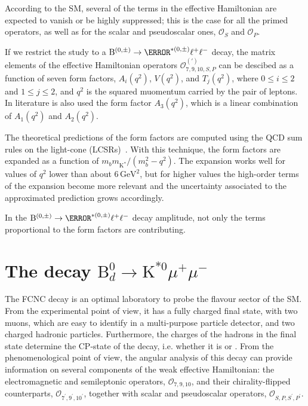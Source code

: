 According to the SM, several of the terms in the effective Hamiltonian are expected to vanish or be highly suppressed; this is the case for all the primed operators, as well as for the scalar and pseudoscalar ones, ${\mathcal{O}}_{S}$ and ${\mathcal{O}}_{P}$.

If we restrict the study to a $\mathrm{B}^{(0,\pm)}\to\K^{*(0,\pm)}\ell^+\ell^-$ decay, the matrix elements of the effective Hamiltonian operators ${\mathcal{O}}^{(\prime)}_{7,9,10,S,P}$ can be descibed as a function of seven form factors, $A_i(q^2)$, $V(q^2)$, and $T_j(q^2)$, where $0\le i\le2$ and $1\le j\le2$, and $q^2$ is the squared muomentum carried by the pair of leptons.
In literature is also used the form factor $A_3(q^2)$, which is a linear combination of $A_1(q^2)$ and $A_2(q^2)$.

The theoretical predictions of the form factors are computed using the QCD sum rules on the light-cone (LCSRs)~\cite{Khodjamirian:2001bj}.
With this technique, the form factors are expanded as a function of $m_b m_{\mathrm{K}^*}/(m_b^2-q^2)$.
The expansion works well for values of $q^2$ lower than about $6\,\mathrm{GeV}^2$, but for higher values the high-order terms of the expansion become more relevant and the uncertainty associated to the approximated prediction grows accordingly.

In the $\mathrm{B}^{(0,\pm)}\to\K^{*(0,\pm)}\ell^+\ell^-$ decay amplitude, not only the terms proportional to the form factors are contributing.







\section[The decay B0 to K*0 mu+ mu-]{The decay $\mathrm{B}^0_d \to \mathrm{K}^{*0} \mu^+ \mu^-$}
\label{sec:Kstmm}

The FCNC decay \BtoKstmumudecay is an optimal laboratory to probe the flavour sector of the SM.
From the experimental point of view, it has a fully charged final state, with two muons, which are easy to identify in a multi-purpose particle detector, and two charged hadronic particles.
Furthermore, the charges of the hadrons in the final state determine the CP-state of the decay, i.e. whether it is \BtoKstmumudecay or \BtoKstmumuconjdecay.
From the phenomenological point of view, the angular analysis of this decay can provide information on several components of the weak effective Hamiltonian: the electromagnetic and semileptonic operators, $\mathcal{O}_{7,9,10}$, and their chirality-flipped counterparts, $\mathcal{O}_{7^\prime,9^\prime,10^\prime}$, together with scalar and pseudoscalar operators, $\mathcal{O}_{S,P,S^\prime,P^\prime}$.

